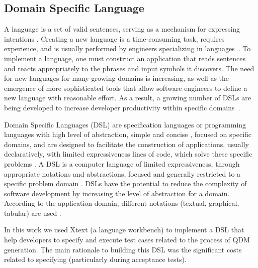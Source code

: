 \subsection{Domain Specific Language}

A language is a set of valid sentences, serving as a mechanism for expressing intentions \cite{parr2010}. 
Creating a new language is a time-consuming task, requires experience, and is usually performed by engineers specializing 
in languages~\cite{karsai2014}. To implement a language, one must construct an application that reads sentences and reacts 
appropriately to the phrases and input symbols it discovers.
The need for new languages for many growing domains is increasing, as well as the emergence of more sophisticated 
tools that allow software engineers to define a new language with reasonable effort. As a result, a growing number of DSLs 
are being developed to increase developer productivity within specific domains~\cite{karsai2014}. 


Domain Specific Languages (DSL) are specification languages or programming languages with high level of abstraction, 
simple and concise \cite{raja2010}, focused on specific domains, and are designed to facilitate the construction of applications, 
usually declaratively, with limited expressiveness lines of code, which solve these specific problems \cite{neeraj2017}. 
A DSL is a computer language of limited expressiveness, through appropriate notations and abstractions, focused and generally 
restricted to a specific problem domain \cite{fowler2013,vanDeursen2000}. DSLs have the 
potential to reduce the complexity of software development by increasing the level of abstraction for a domain. 
According to the application domain, different notations (textual, graphical, tabular) are used \cite{pfeiffer2008}.


In this work we used Xtext (a language workbench) to implement a DSL that help developers to specify and execute 
test cases related to the process of QDM generation. The main rationale to building this DSL was the significant 
costs related to specifying \callers (particularly during acceptance tests). 

